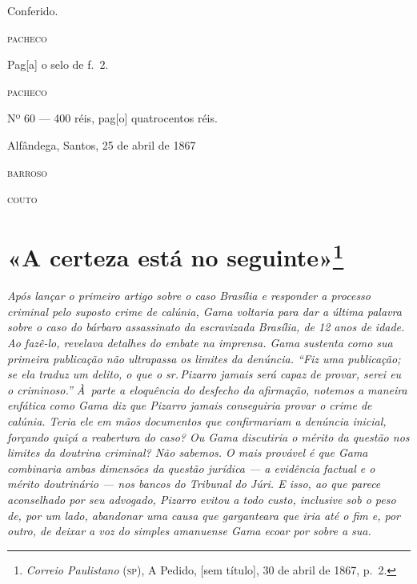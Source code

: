 \begin{flushright}
Conferido.

\textsc{pacheco}
\end{flushright}

\begin{flushright}
Pag{[}a{]} o selo de f.~2.

\textsc{pacheco}
\end{flushright}

\begin{flushright}
Nº 60 --- 400 réis, pag{[}o{]} quatrocentos réis.

Alfândega, Santos, 25 de abril de 1867

\textsc{barroso}

\textsc{couto}
\end{flushright}

\chapter{«A certeza está no seguinte»\footnote{
  \emph{Correio Paulistano} (\textsc{sp}), A Pedido,
  {[}sem título{]}, 30 de abril de 1867, p.~2.}}

\begin{didascalia}\itshape
Após lançar o primeiro artigo sobre o caso Brasília e responder a
processo criminal pelo suposto crime de calúnia, Gama voltaria para dar
a última palavra sobre o caso do bárbaro assassinato da escravizada
Brasília, de 12 anos de idade. Ao fazê-lo, revelava detalhes do
embate na imprensa. Gama sustenta como sua primeira publicação não
ultrapassa os limites da denúncia. ``Fiz uma publicação; se ela traduz um
delito, o que o sr.\,Pizarro jamais será capaz de provar, serei eu o
criminoso.'' À~parte a eloquência do desfecho da afirmação, notemos a
maneira enfática como Gama diz que Pizarro jamais conseguiria provar o
crime de calúnia. Teria ele em mãos documentos que confirmariam a
denúncia inicial, forçando quiçá a reabertura do caso? Ou Gama
discutiria o mérito da questão nos limites da doutrina criminal? Não
sabemos. O mais provável é que Gama combinaria ambas dimensões da
questão jurídica --- a evidência factual e o mérito doutrinário --- nos
bancos do Tribunal do Júri. E isso, ao que parece aconselhado por seu
advogado, Pizarro evitou a todo custo, inclusive sob o peso de, por um
lado, abandonar uma causa que garganteara que iria até o fim e, por
outro, de deixar a voz do simples amanuense Gama ecoar por sobre a sua.
\end{didascalia}



